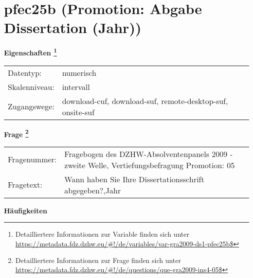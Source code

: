 
    \setcounter{footnote}{0}

    \vspace*{-1.8cm}
	\section{pfec25b (Promotion: Abgabe Dissertation (Jahr))}
	\label{section:pfec25b}



    \vspace*{0.5cm}
    \noindent\textbf{Eigenschaften
	\footnote{Detailliertere Informationen zur Variable finden sich unter
		\url{https://metadata.fdz.dzhw.eu/\#!/de/variables/var-gra2009-ds1-pfec25b$}}}\\
	\begin{tabularx}{\hsize}{@{}lX}
	Datentyp: & numerisch \\
	Skalenniveau: & intervall \\
	Zugangswege: &
	  download-cuf, 
	  download-suf, 
	  remote-desktop-suf, 
	  onsite-suf
 \\
    \end{tabularx}



				\vspace*{0.5cm}
                \noindent\textbf{Frage
	                \footnote{Detailliertere Informationen zur Frage finden sich unter
		              \url{https://metadata.fdz.dzhw.eu/\#!/de/questions/que-gra2009-ins4-05$}}}\\
				\begin{tabularx}{\hsize}{@{}lX}
					Fragenummer: &
					  Fragebogen des DZHW-Absolventenpanels 2009 - zweite Welle, Vertiefungsbefragung Promotion:
					  05
 \\
					Fragetext: & Wann haben Sie Ihre Dissertationsschrift abgegeben?,Jahr \\
				\end{tabularx}





        		\vspace*{0.5cm}
                \noindent\textbf{Häufigkeiten}

